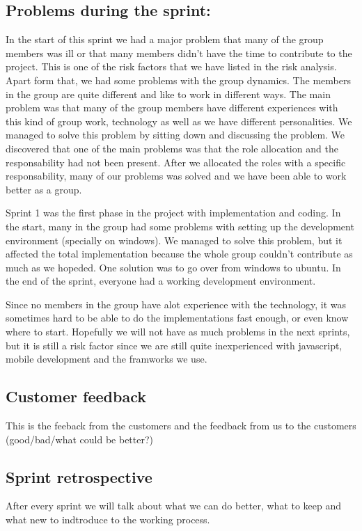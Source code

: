 \subsection{Problems during the sprint:}
In the start of this sprint we had a major problem that many of the group members was ill or 
that many members didn't have the time to contribute to the project. This is one of the risk factors 
that we have listed in the risk analysis. 
Apart form that, we had some problems with the group dynamics. The members in the group are 
quite different and like to work in different ways. The main problem was that many of the group members
have different experiences with this kind of group work, technology as well as we have 
different personalities.
We managed to solve this problem by sitting down and discussing the problem. We discovered that
one of the main problems was that the role allocation and the responsability had not been present.
After we allocated the roles with a specific responsability, many of our problems was solved and
we have been able to work better as a group.

Sprint 1 was the first phase in the project with implementation and coding. In the start, many in the group had
some problems with setting up the development environment (specially on windows). We managed
to solve this problem, but it affected the total implementation because the whole group couldn't 
contribute as much as we hopeded. One solution was to go over from windows to ubuntu. 
In the end of the sprint, everyone had a working development environment.

Since no members in the group have alot experience with the technology, it was sometimes hard
to be able to do the implementations fast enough, or even know where to start. 
Hopefully we will not have as much problems in the next sprints, but it is still a risk factor 
since we are still quite inexperienced with javascript, mobile development and the framworks we use. 

\subsection{Customer feedback}
	This is the feeback from the customers and the feedback from us to the customers (good/bad/what could be better?)

\subsection{Sprint retrospective}
	After every sprint we will talk about what we can do better, what to keep and what new to indtroduce to the working process.